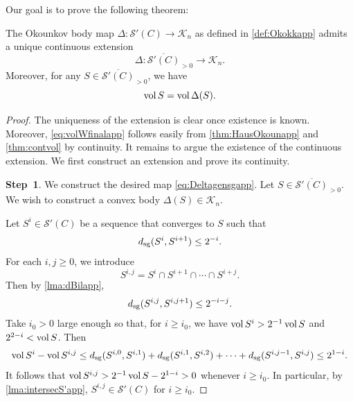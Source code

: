 Our goal is to prove the following theorem:
\begin{theorem}\label{thm:Okocontapp}
	The Okounkov body map $\Delta\colon \mathcal{S}'(C) \rightarrow \mathcal{K}_n$
    as defined in \cref{def:Okokkapp} admits a unique continuous extension
	\begin{equation}\label{eq:Deltagensgapp}
		\Delta \colon \overline{\mathcal{S}'(C)}_{>0}\rightarrow \mathcal{K}_n.
	\end{equation}
     Moreover, for any $S\in \overline{\mathcal{S}'(C)}_{>0}$, we have
	\begin{equation}\label{eq:volWfinalapp}
		\operatorname{vol} S=\operatorname{vol} \Delta(S).
	\end{equation}
\end{theorem}



\begin{proof}
The uniqueness of the extension is clear once existence is known. Moreover, \eqref{eq:volWfinalapp} follows easily from \cref{thm:HausOkounapp} and \cref{thm:contvol} by continuity.
It remains to argue the existence of the continuous extension. We first construct an extension and prove its continuity.

\textbf{Step~1}. We construct the desired map \eqref{eq:Deltagensgapp}. Let $S\in \overline{\mathcal{S}'(C)}_{>0}$. We wish to construct a convex body $\Delta(S)\in \mathcal{K}_n$.

    Let $S^i\in \mathcal{S}'(C)$ be a sequence that converges to $S$ such that
    \[
    d_{\mathrm{sg}}(S^i,S^{i+1})\leq 2^{-i}.
    \]
    For each $i,j\geq 0$, we introduce
    \[
    S^{i,j}=S^i\cap S^{i+1}\cap \cdots \cap S^{i+j}.
    \]
    Then by \cref{lma:dBilapp},
    \[
    d_{\mathrm{sg}}(S^{i,j},S^{i,j+1})\leq 2^{-i-j}.
    \]
    Take $i_0>0$ large enough so that, for $i\geq i_0$, we have $\operatorname{vol} S^i>2^{-1}\operatorname{vol} S$ and $2^{2-i}< \operatorname{vol} S$. Then
    \[
        \operatorname{vol} S^i-\operatorname{vol} S^{i,j}\leq d_{\mathrm{sg}}(S^{i,0},S^{i,1})+d_{\mathrm{sg}}(S^{i,1},S^{i,2})+\cdots+d_{\mathrm{sg}}(S^{i,j-1},S^{i,j})\leq 2^{1-i}.
    \]
    It follows that $\operatorname{vol} S^{i,j}> 2^{-1}\operatorname{vol} S-2^{1-i}>0$ whenever $i\geq i_0$. In particular, by \cref{lma:intersecS'app}, $S^{i,j}\in \mathcal{S}'(C)$ for $i\geq i_0$.


\end{proof}
